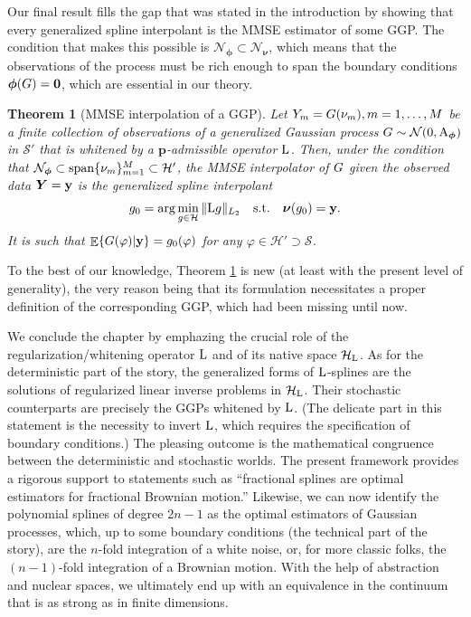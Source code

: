 \documentclass[11pt, english,english]{article}
\newtheorem{theorem}{Theorem}
\newcommand{\Lop}{{\rm L}}
\def\V#1{{\boldsymbol{#1}}}         %
\def\Spc#1{{\mathcal{#1}}}  %
\def\M#1{{\bf{#1}}}  %
\def\Op#1{{\mathrm{#1}}}  %
\def\Exp{\mathop{\mathbb{E}}\nolimits}
\renewcommand{\[}{\begin{equation}}
\renewcommand{\]}[1]{\label{eq:#1}\end{equation}}
\def\Exp{\mathop{\mathbb{E}}\nolimits}
\def\Rand#1{{\uppercase{#1}}}         %
\def\VRand#1{{\uppercase{\boldsymbol #1}}}         %
\def\gRand#1{{\uppercase{ #1}}}         %
\begin{document}
Our final result fills the gap that was stated in the introduction by showing that every generalized spline interpolant is the MMSE
estimator of some GGP. The condition that makes this possible is $\Spc N_{\V \phi} \subset \Spc N_{\V \nu}$, which means that the observations of the process must be rich enough to span the boundary conditions $\V \phi(\gRand G)=\V 0$, which are essential in our theory.
\begin{theorem}[MMSE interpolation of a GGP]
\label{Theo:Unser}
Let $\Rand Y_m=\gRand G(\nu_m), m=1,\dots,M$ be a finite collection of observations of a generalized Gaussian process $\Rand G\sim \Spc N(0,\Op A_{\V \phi})$ in $\Spc S'$ that is whitened by a $\V p$-admissible operator $\Lop$. Then, under the condition that $\Spc N_{\V \phi} \subset {\rm span}\{ \nu_m\}_{m=1}^{M}\subset \Spc H'$, the {\em MMSE interpolator} of $\gRand G$ given the observed data
$\VRand y=\M y$ is the generalized spline interpolant 
\begin{align}
g_0=\arg \min_{g \in \Spc H} \|\Lop g\|_{L_2}
\quad \mbox{s.t.}\quad \V \nu(g_0)=\M y.
\end{align}
It is such that $\Exp\{\gRand G(\varphi)|\M y\}=g_0(\varphi)$ for any $\varphi \in \Spc H'\supset \Spc S$.
\end{theorem}
To the best of our knowledge, Theorem \ref{Theo:Unser} is new (at least with the present level of generality), the very reason being that its formulation necessitates a proper definition of the corresponding GGP, which had been missing until now. 

We conclude the chapter by emphazing the crucial role of the regularization/whitening operator $\Lop$ and of its native space $\Spc H_\Lop$. As for the deterministic part of the story, the generalized forms of $\Lop$-splines are the solutions of regularized linear inverse problems in $\Spc H_\Lop$. Their stochastic counterparts are precisely the GGPs whitened by $\Lop$. (The delicate part in this statement is the necessity to invert $\Lop$, which requires the specification of boundary conditions.) The pleasing outcome is the mathematical congruence between the deterministic and stochastic worlds. The present framework provides a rigorous support to statements such as ``fractional splines are optimal estimators for fractional Brownian motion.'' Likewise, we can now identify the polynomial splines of degree $2n-1$ as the optimal estimators of Gaussian processes, which, up to some boundary conditions (the technical part of the story), are the $n$-fold integration of a white noise, or, for more classic folks,  the $(n-1)$-fold integration of a Brownian motion.
With the help of abstraction and nuclear spaces, we ultimately end up with an equivalence in the continuum that is as strong as in finite dimensions.
\appendix
\end{document}
